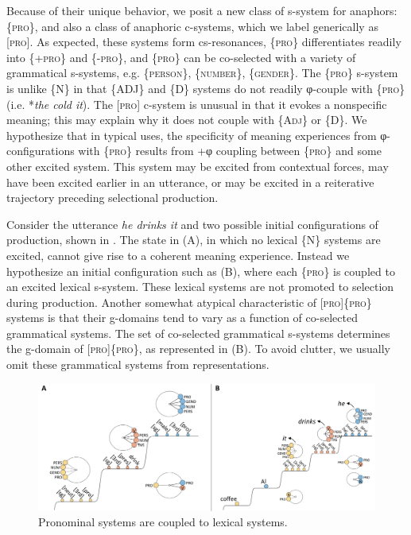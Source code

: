 Because of their unique behavior, we posit a new class of s-system for anaphors: \{\textsc{pro}\}, and also a class of anaphoric c-systems, which we label generically as [\textsc{pro}]. As expected, these systems form cs-resonances,  \{\textsc{pro}\} differentiates readily into \{+\textsc{pro}\} and \{-\textsc{pro}\}, and \{\textsc{pro}\} can be co-selected with a variety of grammatical s-systems, e.g. \{\textsc{person}\}, \{\textsc{number}\}, \{\textsc{gender}\}. The \{\textsc{pro}\} s-system is unlike \{N\} in that \{ADJ\} and \{D\} systems do not readily φ-couple with \{\textsc{pro}\} (i.e. *\textit{the cold it}). The [\textsc{pro}] c-system is unusual in that it evokes a nonspecific meaning; this may explain why it does not couple with \{A\textsc{dj}\} or \{D\}. We hypothesize that in typical uses, the specificity of meaning experiences from φ-configurations with \{\textsc{pro}\} results from +φ coupling between \{\textsc{pro}\} and some other excited system. This system may be excited from contextual forces, may have been excited earlier in an utterance, or may be excited in a reiterative trajectory preceding selectional production. 

   Consider the utterance \textit{he drinks it} and two possible initial configurations of production, shown in {}. The state in (A), in which no lexical \{N\} systems are excited, cannot give rise to a coherent meaning experience. Instead we hypothesize an initial configuration such as (B), where each \{\textsc{pro}\} is coupled to an excited lexical s-system. These lexical systems are not promoted to selection during production. Another somewhat atypical characteristic of [\textsc{pro}]\{\textsc{pro}\} systems is that their g-domains tend to vary as a function of co-selected grammatical systems. The set of co-selected grammatical s-systems determines the g-domain of [\textsc{pro}]\{\textsc{pro}\}, as represented in (B). To avoid clutter, we usually omit these grammatical systems from representations.   

  
\begin{figure}
\includegraphics[width=\textwidth]{figures/Tilsen-img152.png}
\caption{Pronominal systems are coupled to lexical systems.}
\label{fig:7:8}
\end{figure}
 

